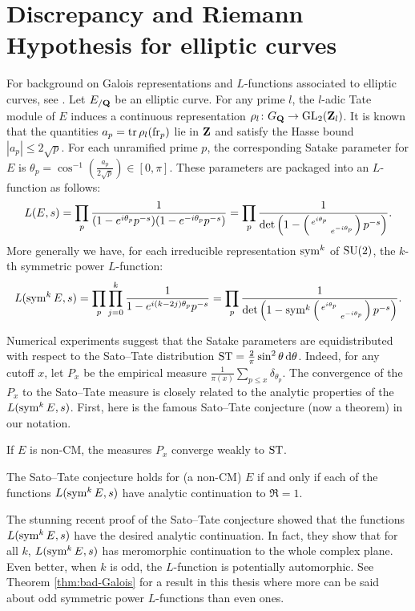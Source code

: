 \section{Discrepancy and Riemann Hypothesis for elliptic curves}

For background on Galois representations and $L$-functions associated to 
elliptic curves, see \cite[III\S7, C\S17]{silverman-2009}. 
Let $E_{/\mathbf{Q}}$ be an elliptic curve. For any prime $l$, the $l$-adic Tate 
module of $E$ induces a continuous representation 
$\rho_l \colon G_{\mathbf{Q}} \to \operatorname{GL}_2(\mathbf{Z}_l)$. It is known that the quantities 
$a_p = \operatorname{tr} \rho_l(\mathrm{fr}_p)$ lie in $\mathbf{Z}$ and satisfy the Hasse bound 
$|a_p| \leqslant 2\sqrt p$. For each unramified prime $p$, the 
corresponding Satake parameter for $E$ is 
$\theta_p = \cos^{-1}\left(\frac{a_p}{2\sqrt p}\right) \in [0,\pi]$. 
These parameters are packaged into an $L$-function as follows:
\[
	L(E,s) = \prod_p \frac{1}{(1 - e^{i \theta_p} p^{-s})(1- e^{-i \theta_p} p^{-s})} = \prod_p \frac{1}{\det\left(1 - \left(\begin{smallmatrix} e^{i\theta_p} &  \\  & e^{-i \theta_p} \end{smallmatrix}\right)p^{-s}\right)}.
\]
More generally we have, for each irreducible representation $\operatorname{sym}^k$ of 
$\operatorname{SU}(2)$, the $k$-th symmetric power $L$-function: 
\[
	L(\operatorname{sym}^k E, s) = \prod_p \prod_{j=0}^k \frac{1}{1 - e^{i (k - 2j) \theta_p} p^{-s}} = \prod_p \frac{1}{\det\left(1-\operatorname{sym}^k \left(\begin{smallmatrix} e^{i\theta_p} &  \\  & e^{-i \theta_p} \end{smallmatrix}\right)p^{-s}\right)}.
\]

Numerical experiments suggest that the Satake parameters are equidistributed 
with respect to the Sato--Tate distribution 
$\mathrm{ST} = \frac{2}{\pi} \sin^2\theta\, \mathrm{d}\theta$. Indeed, for any cutoff $x$, let 
$P_x$ be the empirical measure 
$\frac{1}{\pi(x)} \sum_{p\leqslant x} \delta_{\theta_p}$. 
The convergence of the $P_x$ to the Sato--Tate measure is closely related to 
the analytic properties of the $L(\operatorname{sym}^k E,s)$. First, here is the famous 
Sato--Tate conjecture (now a theorem) in our notation. 

\begin{theorem}[Taylor et.~al.]
If $E$ is non-CM, the measures $P_x$ converge weakly to $\mathrm{ST}$. 
\end{theorem}

\begin{theorem}[Serre]
The Sato--Tate conjecture holds for (a non-CM) $E$ if and only if each of 
the functions $L(\operatorname{sym}^k E,s)$ have analytic continuation to $\Re = 1$. 
\end{theorem}

The stunning recent proof of the Sato--Tate conjecture 
\cite{clozel-harris-taylor-2008,taylor-2008,harris-shepherd-barron-taylor-2010} 
showed that the functions $L(\operatorname{sym}^k E,s)$ have the desired analytic 
continuation. In fact, they show that for all $k$, $L(\operatorname{sym}^k E,s)$ has 
meromorphic continuation to the whole complex plane. Even better, when $k$ is 
odd, the $L$-function is potentially automorphic. See Theorem 
\ref{thm:bad-Galois} for a result in this thesis where more can be said about 
odd symmetric power $L$-functions than even ones. 

